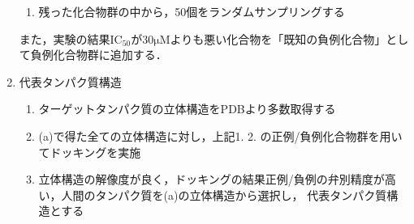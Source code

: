 \begin{enumerate}
\begin{enumerate}
	\item 残った化合物群の中から，50個をランダムサンプリングする
	\end{enumerate}
	また，実験の結果$\mathrm{IC_{50}}$が$\mathrm{30\mu M}$よりも悪い化合物を「既知の負例化合物」として負例化合物群に追加する．
\item 代表タンパク質構造
	\begin{enumerate}
	\item ターゲットタンパク質の立体構造をPDBより多数取得する
	\item (a)で得た全ての立体構造に対し，上記1. 2. の正例/負例化合物群を用いてドッキングを実施
	\item 立体構造の解像度が良く，ドッキングの結果正例/負例の弁別精度が高い，人間のタンパク質を(a)の立体構造から選択し，
		代表タンパク質構造とする
	\end{enumerate}
\end{enumerate}

\newpage

